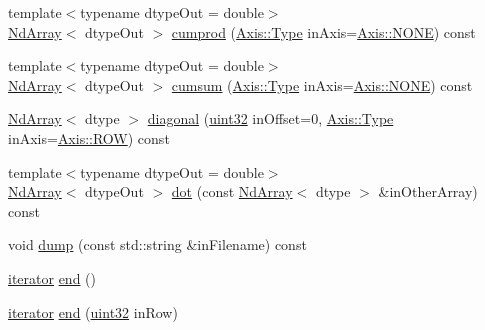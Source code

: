 \begin{DoxyCompactItemize}
\item 
{\footnotesize template$<$typename dtype\+Out  = double$>$ }\\\mbox{\hyperlink{class_num_cpp_1_1_nd_array}{Nd\+Array}}$<$ dtype\+Out $>$ \mbox{\hyperlink{class_num_cpp_1_1_nd_array_a7c1b8059331233f74df6fde8d2e341cd}{cumprod}} (\mbox{\hyperlink{struct_num_cpp_1_1_axis_ac10eb76f8631762d9ed70c40c42ca6cb}{Axis\+::\+Type}} in\+Axis=\mbox{\hyperlink{struct_num_cpp_1_1_axis_ac10eb76f8631762d9ed70c40c42ca6cba747ae657022cca1d87702b56d0c038e9}{Axis\+::\+N\+O\+NE}}) const
\item 
{\footnotesize template$<$typename dtype\+Out  = double$>$ }\\\mbox{\hyperlink{class_num_cpp_1_1_nd_array}{Nd\+Array}}$<$ dtype\+Out $>$ \mbox{\hyperlink{class_num_cpp_1_1_nd_array_ab3c9386bc67e6618f22dca7072b9b548}{cumsum}} (\mbox{\hyperlink{struct_num_cpp_1_1_axis_ac10eb76f8631762d9ed70c40c42ca6cb}{Axis\+::\+Type}} in\+Axis=\mbox{\hyperlink{struct_num_cpp_1_1_axis_ac10eb76f8631762d9ed70c40c42ca6cba747ae657022cca1d87702b56d0c038e9}{Axis\+::\+N\+O\+NE}}) const
\item 
\mbox{\hyperlink{class_num_cpp_1_1_nd_array}{Nd\+Array}}$<$ dtype $>$ \mbox{\hyperlink{class_num_cpp_1_1_nd_array_ad3b30513f29c3daec09f7e3ed39f5777}{diagonal}} (\mbox{\hyperlink{namespace_num_cpp_a36f388e948380413c63011cab9b7fbd5}{uint32}} in\+Offset=0, \mbox{\hyperlink{struct_num_cpp_1_1_axis_ac10eb76f8631762d9ed70c40c42ca6cb}{Axis\+::\+Type}} in\+Axis=\mbox{\hyperlink{struct_num_cpp_1_1_axis_ac10eb76f8631762d9ed70c40c42ca6cbad9f2ab1396aad2412d9c77fbcbbe6aca}{Axis\+::\+R\+OW}}) const
\item 
{\footnotesize template$<$typename dtype\+Out  = double$>$ }\\\mbox{\hyperlink{class_num_cpp_1_1_nd_array}{Nd\+Array}}$<$ dtype\+Out $>$ \mbox{\hyperlink{class_num_cpp_1_1_nd_array_a031fe38384c9d6136fc5a066460ec94a}{dot}} (const \mbox{\hyperlink{class_num_cpp_1_1_nd_array}{Nd\+Array}}$<$ dtype $>$ \&in\+Other\+Array) const
\item 
void \mbox{\hyperlink{class_num_cpp_1_1_nd_array_a406dd6205b385227aa1699272702bb87}{dump}} (const std\+::string \&in\+Filename) const
\item 
\mbox{\hyperlink{class_num_cpp_1_1_nd_array_ac56493775d6c0ff556ed7d6c9e7c07b4}{iterator}} \mbox{\hyperlink{class_num_cpp_1_1_nd_array_a7c6dfc0aa51f8e7347e84e7a9cca9e5c}{end}} ()
\item 
\mbox{\hyperlink{class_num_cpp_1_1_nd_array_ac56493775d6c0ff556ed7d6c9e7c07b4}{iterator}} \mbox{\hyperlink{class_num_cpp_1_1_nd_array_aedaf352bf0f00435ab5fdedb9ac87e96}{end}} (\mbox{\hyperlink{namespace_num_cpp_a36f388e948380413c63011cab9b7fbd5}{uint32}} in\+Row)

\end{DoxyCompactItemize}
